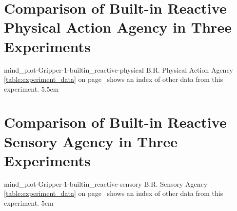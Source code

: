 {\clearpage
  \section{Comparison of Built-in Reactive Physical Action Agency in Three Experiments}
  \experimentcausegroupplots{\dataappendixmaxtime}
                            {\dataappendixexperimentonemaxtime}
                            {\dataappendixexperimenttwomaxtime}
                            {\dataappendixexperimentthreemaxtime}
                            {\dataappendixexperimentonename}
                            {\dataappendixexperimenttwoname}
                            {\dataappendixexperimentthreename}
                            {\dataappendixexperimentoneprettyname}
                            {\dataappendixexperimenttwoprettyname}
                            \experimentcausegroupplotscontinued{\dataappendixexperimentthreeprettyname}
                                                               {mind_plot-Gripper-1-builtin_reactive-physical}
                                                               {B.R. Physical Action Agency}
                                                               {  {\mbox{\autoref{table:experiment_data}}} on
                                                                 {\mbox{page~\pageref{table:experiment_data}}} shows an index of other data
                                                                 from this experiment.}
                                                               {5.5cm}
}
{\clearpage
  \section{Comparison of Built-in Reactive Sensory Agency in Three Experiments}
  \experimentcausegroupplots{\dataappendixmaxtime}
                            {\dataappendixexperimentonemaxtime}
                            {\dataappendixexperimenttwomaxtime}
                            {\dataappendixexperimentthreemaxtime}
                            {\dataappendixexperimentonename}
                            {\dataappendixexperimenttwoname}
                            {\dataappendixexperimentthreename}
                            {\dataappendixexperimentoneprettyname}
                            {\dataappendixexperimenttwoprettyname}
                            \experimentcausegroupplotscontinued{\dataappendixexperimentthreeprettyname}
                                                               {mind_plot-Gripper-1-builtin_reactive-sensory}
                                                               {B.R. Sensory Agency}
                                                               {  {\mbox{\autoref{table:experiment_data}}} on
                                                                 {\mbox{page~\pageref{table:experiment_data}}} shows an index of other data
                                                                 from this experiment.}
                                                               {5cm}
}



